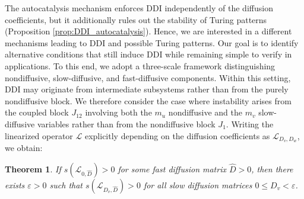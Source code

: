 \documentclass[12pt, a4paper]{amsart}
\numberwithin{equation}{section}
\newcommand{\Ds}{D_v}
\newcommand{\Df}{D_w}
\newcommand{\mn}{m_{u}}  %
\newcommand{\ms}{m_{v}}  %
\renewcommand{\L}{{\mathcal{L}}}
\newtheorem{theorem}{\bf Theorem}[section]
\begin{document}
The autocatalysis mechanism enforces DDI independently of the diffusion coefficients, but it additionally rules out the stability of Turing patterns (Proposition \ref{prop:DDI_autocatalysis}).
Hence, we are interested in a different mechanisms leading to DDI and possible Turing patterns.
Our goal is to identify alternative conditions that still induce DDI while remaining simple to verify in applications.
To this end, we adopt a three-scale framework distinguishing nondiffusive, slow-diffusive, and fast-diffusive components.
Within this setting, DDI may originate from intermediate subsystems rather than from the purely nondiffusive block.
We therefore consider the case where instability arises from the coupled block $J_{12}$ involving both the $\mn$ nondiffusive and the $\ms$ slow-diffusive variables rather than from the nondiffusive block $J_1$.
Writing the linearized operator $\L$ explicitly depending on the diffusion coefficients as $\L_{\Ds,\Df}$, we obtain:



\begin{theorem}\label{thm:transfer_DDI_positive_D1}
    If $s(\L_{0,\hat{D}})>0$ for some fast diffusion matrix $\hat{D}>0$, then there exists $\varepsilon>0$ such that $s(\L_{\Ds,\hat{D}})>0$ for all slow diffusion matrices $0\leqslant \Ds<\varepsilon$.
\end{theorem}
\end{document}
